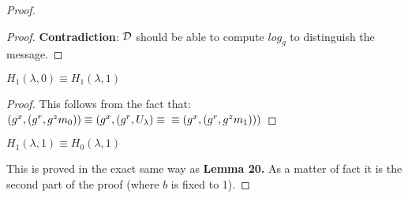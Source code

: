 \begin{proof}
\begin{proof}
        \textbf{Contradiction}: $\mathcal{D}$ should be able to compute $log_g$ to distinguish the message.

    \end{proof}

    \begin{lemma}
        $H_1(\lambda,0)\equiv H_1(\lambda,1)$
    \end{lemma}
    \begin{proof}
        This follows from the fact that:
        $(g^x,(g^r,g^z m_0))\equiv (g^x,(g^r,U_{\lambda}) \equiv \\ \equiv (g^x,(g^r,g^z m_1)))$
    \end{proof}
    
    \begin{lemma}
        $H_1(\lambda,1)\equiv H_0(\lambda,1)$
    \end{lemma}
    This is proved in the exact same way as \textbf{Lemma 20.} As a matter of fact it is the second part of the proof (where $b$ is fixed to 1).
    
\end{proof}